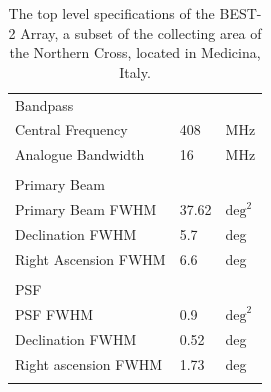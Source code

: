 \documentclass[useAMS,macros,usenatbib]{mn2e}
\begin{document}
\begin{table}
\begin{tabular}{| l | l | l |}
				      &            &            	\\
      \hline
      Bandpass        		&            &       		\\
      \hline
      Central Frequency 		&        408 &        MHz 	\\
      Analogue Bandwidth 		&         16 &        MHz 	\\
				      &            &            	\\
      \hline
      Primary Beam 			&            &           	\\
      \hline
      Primary Beam FWHM 		&      37.62 & $\textrm{deg}^2$ \\
      Declination FWHM 			&        5.7 &        deg 	\\
      Right Ascension FWHM		&        6.6 &        deg 	\\
				      &            &            	\\
      \hline
      PSF    				&            &       		\\
      \hline
      PSF FWHM 			&        0.9 & $\textrm{deg}^2$ \\
      Declination FWHM			&       0.52 &     deg 		\\
      Right ascension FWHM		&       1.73 &     deg 		\\
				      &            &            	\\
      \hline
      \end{tabular}
      \caption{The top level specifications of the BEST-2 Array, a subset of the collecting area of the Northern Cross, located in Medicina, Italy.}
      \label{tbl:best2}
\end{table}

  


\end{document}
